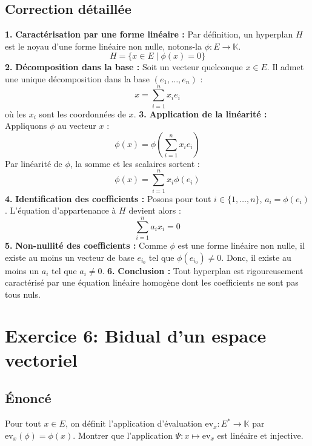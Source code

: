 \documentclass[12pt,a4paper]{report}
\begin{document}
\section{Correction détaillée}
\textbf{1.} \textbf{Caractérisation par une forme linéaire :} Par définition, un hyperplan $H$ est le noyau d'une forme linéaire non nulle, notons-la $\phi : E \to \mathbb{K}$.
   $$H = \{ x \in E \mid \phi(x) = 0 \}$$
\textbf{2.} \textbf{Décomposition dans la base :} Soit un vecteur quelconque $x \in E$. Il admet une unique décomposition dans la base $(e_1, \dots, e_n)$ :
   $$x = \sum_{i=1}^n x_i e_i$$
   où les $x_i$ sont les coordonnées de $x$.
\textbf{3.} \textbf{Application de la linéarité :} Appliquons $\phi$ au vecteur $x$ :
   $$\phi(x) = \phi\left(\sum_{i=1}^n x_i e_i\right)$$
   Par linéarité de $\phi$, la somme et les scalaires sortent :
   $$\phi(x) = \sum_{i=1}^n x_i \phi(e_i)$$
\textbf{4.} \textbf{Identification des coefficients :} Posons pour tout $i \in \{1, \dots, n\}$, $a_i = \phi(e_i)$. L'équation d'appartenance à $H$ devient alors :
   $$\sum_{i=1}^n a_i x_i = 0$$
\textbf{5.} \textbf{Non-nullité des coefficients :} Comme $\phi$ est une forme linéaire non nulle, il existe au moins un vecteur de base $e_{i_0}$ tel que $\phi(e_{i_0}) \neq 0$. Donc, il existe au moins un $a_i$ tel que $a_i \neq 0$.
\textbf{6.} \textbf{Conclusion :} Tout hyperplan est rigoureusement caractérisé par une équation linéaire homogène dont les coefficients ne sont pas tous nuls.

\newpage
\chapter{Exercice 6: Bidual d'un espace vectoriel}
\section{Énoncé}
Pour tout $x \in E$, on définit l'application d'évaluation $\text{ev}_x : E^* \to \mathbb{K}$ par $\text{ev}_x(\phi) = \phi(x)$. Montrer que l'application $\Psi : x \mapsto \text{ev}_x$ est linéaire et injective.
\end{document}
